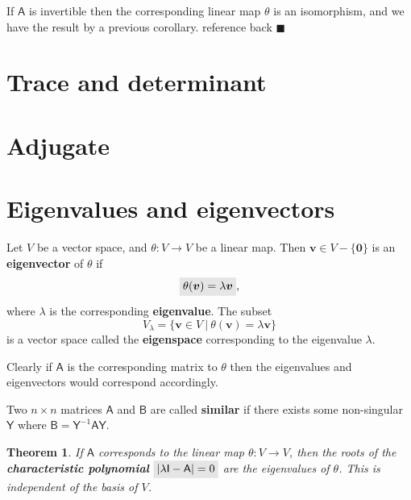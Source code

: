 \documentclass[letter-paper]{tufte-book}
\newtheorem{theorem}{\color{pastel-blue}Theorem}[section]
\newenvironment{proof}[1][Proof]{\begin{trivlist}
\item[\hskip \labelsep {\bfseries #1}]}{\end{trivlist}}
\newcommand{\As}{{\mathsf{A}}}
\newcommand{\Bs}{{\mathsf{B}}}
\newcommand{\Is}{{\mathsf{I}}}
\newcommand{\Ys}{{\mathsf{Y}}}
\newcommand{\Ob}{{\boldsymbol{0}}}
\newcommand{\vb}{{\boldsymbol{v}}}
\newcommand{\qed}{\hfill$\blacksquare$}
\newcommand{\highlight}[1]{\mathchoice%
  {\colorbox{black!10}{$\displaystyle#1$}}%
  {\colorbox{black!10}{$\textstyle#1$}}%
  {\colorbox{black!10}{$\scriptstyle#1$}}%
  {\colorbox{black!10}{$\scriptscriptstyle#1$}}}%
\begin{document}
\begin{proof}
  If $\As$ is invertible then the corresponding linear map $\theta$ is an
  isomorphism, and we have the result by a previous corollary.
  {\color{red}reference back} \qed
\end{proof}


\section{Trace and determinant}


\section{Adjugate}


\section{Eigenvalues and eigenvectors}

Let $V$ be a vector space, and $\theta:V \to V$ be a linear map. Then $\vb\in
V-\{\Ob\}$ is an \textbf{eigenvector} of $\theta$ if
\begin{equation}
  \highlight{\theta(\vb) = \lambda \vb},
\end{equation}
where $\lambda$ is the corresponding \textbf{eigenvalue}. The subset
\begin{equation}
  V_{\lambda} = \{\vb\in V \ |\ \theta(\vb) = \lambda \vb\}
\end{equation}
is a vector space called the \textbf{eigenspace} corresponding to the eigenvalue
$\lambda$.

Clearly if $\As$ is the corresponding matrix to $\theta$ then the eigenvalues
and eigenvectors would correspond accordingly.

Two $n\times n$ matrices $\As$ and $\Bs$ are called \textbf{similar} if there
exists some non-singular $\Ys$ where $\Bs = \Ys^{-1} \As \Ys$.

\begin{theorem}
  If $\As$ corresponds to the linear map $\theta:V\to V$, then the roots of the
  \textbf{characteristic polynomial} $\highlight{|\lambda\Is - \As| = 0}$ are
  the eigenvalues of $\theta$. This is independent of the basis of $V$.
\end{theorem}
\end{document}
